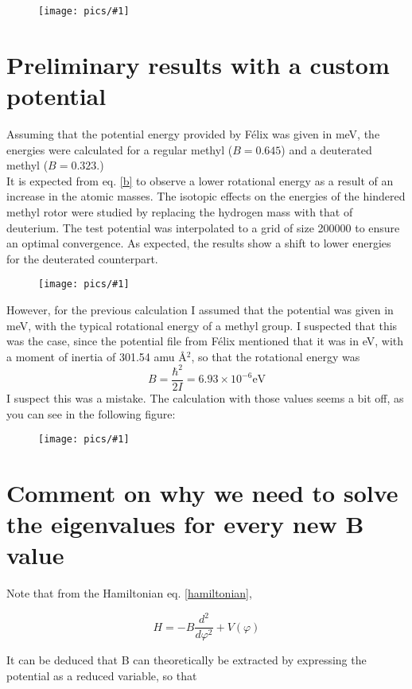 \documentclass[12pt,a4paper]{article}
\newcommand{\NEWPICC}[2]{
\begin{figure}[H]
    \centering
    \texttt{[image: pics/\#1]}
    \label{#1}
    \end{figure}
    }
\begin{document}
\NEWPICC{titov2023_1.png}{1}


\section{Preliminary results with a custom potential}


Assuming that the potential energy provided by Félix was given in meV, the energies were calculated for a regular methyl ($B=0.645$) and a deuterated methyl ($B=0.323$.)\\

It is expected from eq. \eqref{b} to observe a lower rotational energy as a result of an increase in the atomic masses. The isotopic effects on the energies of the hindered methyl rotor were studied by replacing the hydrogen mass with that of deuterium. The test potential was interpolated to a grid of size 200000 to ensure an optimal convergence. As expected, the results show a shift to lower energies for the deuterated counterpart.

\NEWPICC{interpolate_potential_HD.png}{1}

However, for the previous calculation I assumed that the potential was given in meV, with the typical rotational energy of a methyl group. I suspected that this was the case, since the potential file from Félix mentioned that it was in eV, with a moment of inertia of 301.54 amu \AA$^2$, so that the rotational energy was
$$
B = \frac{\hbar^2}{2 I} = 6.93 \times 10^{-6} \text{eV}
$$
I suspect this was a mistake. The calculation with those values seems a bit off, as you can see in the following figure:


\NEWPICC{potential_felix.png}{0.95}


\section{Comment on why we need to solve the eigenvalues for every new B value}


Note that from the Hamiltonian eq. \eqref{hamiltonian},

\begin{equation*}
    H = -B \frac{d^2}{d\varphi^2} + V(\varphi)
\end{equation*}

It can be deduced that B can theoretically be extracted by expressing the potential as a reduced variable, so that
\end{document}
